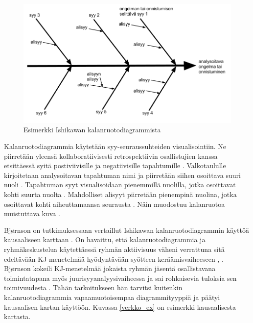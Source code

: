 \begin{figure}[ht!]
\centering
\includegraphics[width=150mm]{ishikawa_esimerkki.png}
\caption{Esimerkki Ishikawan kalanruotodiagrammista}
\label{ishikawa_ex}
\end{figure}

Kalanruotodiagrammia käytetään syy-seuraussuhteiden visualisointiin. Ne piirretään yleensä kollaboratiivisesti retrospektiivin osallistujien kanssa etsittäessä syitä postiviivisille ja negatiivisille tapahtumille \citep{birk2002postmortem}. Valkotaululle kirjoitetaan analysoitavan tapahtuman nimi ja piirretään siihen osoittava suuri nuoli \citep{Bjornson2009}. Tapahtuman syyt visualisoidaan pienemmillä nuolilla, jotka osoittavat kohti suurta nuolta \citep{Bjornson2009}. Mahdolliset alisyyt piirretään pienempinä nuolina, jotka osoittavat kohti aiheuttamaansa seurausta \citep{Bjornson2009}. Näin muodostuu kalanruotoa muistuttava kuva \citep{birk2002postmortem}.

Bj{\o}rnson on tutkimuksessaan vertaillut Ishikawan kalanruotodiagrammin käyttöä kausaaliseen karttaan \citep{Bjornson2009}. On havaittu, että kalanruotodiagrammia ja ryhmäkeskustelua käytettäessä ryhmän aktiivisuus väheni verrattuna sitä edeltävään KJ-menetelmää hyödyntävään syötteen keräämisvaiheeseen \citep{Bjornson2009}, \citep{staalhane2003post}. Bj{\o}rnson kokeili KJ-menetelmää jokaista ryhmän jäsentä osallistavana toimintatapana myös juurisyyanalyysivaiheessa  ja sai rohkaisevia tuloksia sen toimivuudesta \citep{Bjornson2009}. Tähän tarkoitukseen hän tarvitsi kuitenkin kalanruotodiagrammia vapaamuotoisempaa diagrammityyppiä ja päätyi kausaalisen kartan käyttöön. Kuvassa \ref{verkko_ex} on esimerkki kausaalisesta kartasta.

